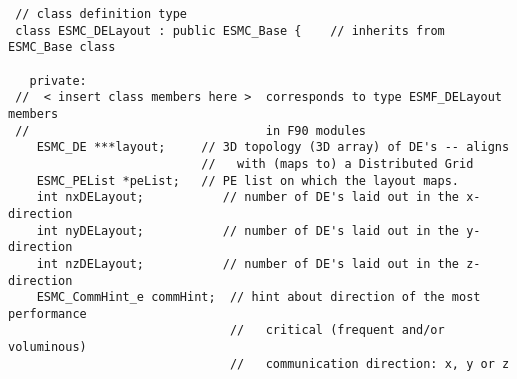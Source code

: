 
\begin{verbatim}
 // class definition type
 class ESMC_DELayout : public ESMC_Base {    // inherits from ESMC_Base class

   private:
 //  < insert class members here >  corresponds to type ESMF_DELayout members
 //                                 in F90 modules
    ESMC_DE ***layout;     // 3D topology (3D array) of DE's -- aligns
                           //   with (maps to) a Distributed Grid
    ESMC_PEList *peList;   // PE list on which the layout maps.
    int nxDELayout;           // number of DE's laid out in the x-direction
    int nyDELayout;           // number of DE's laid out in the y-direction
    int nzDELayout;           // number of DE's laid out in the z-direction
    ESMC_CommHint_e commHint;  // hint about direction of the most performance
                               //   critical (frequent and/or voluminous)
                               //   communication direction: x, y or z
\end{verbatim}
